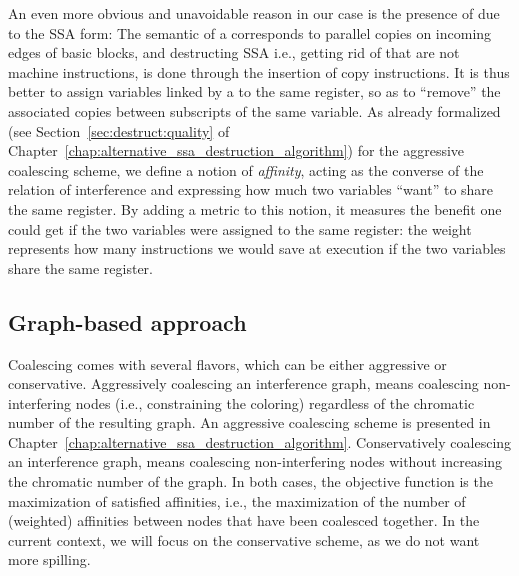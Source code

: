 {An even more obvious and unavoidable reason in our case is the presence of \phifuns due to the SSA form:
The semantic of a \phifun corresponds to parallel copies on incoming edges of basic blocks, and destructing SSA i.e., getting rid of \phifuns that are not machine instructions, is done through the insertion of copy instructions. 
It is thus better to assign variables linked by a \phifun to the same register, so as to ``remove'' the associated copies between subscripts of the same variable.
As already formalized (see Section~\ref{sec:destruct:quality} of Chapter~\ref{chap:alternative_ssa_destruction_algorithm}) for the aggressive coalescing scheme, we define a notion of \emph{affinity}, acting as the converse of the relation of interference and expressing how much two variables ``want'' to share the same register. 
By adding a metric to this notion, it measures the benefit one could get if the two variables were assigned to the same register: 
the weight represents how many instructions we would save at execution if the two variables share the same register. 


\subsection{Graph-based approach}
Coalescing comes with several flavors, which can be either aggressive or conservative.
Aggressively coalescing an interference graph, means coalescing non-interfering nodes (i.e., constraining the coloring) regardless of the chromatic number of the resulting graph.
An aggressive coalescing scheme is presented in Chapter~\ref{chap:alternative_ssa_destruction_algorithm}.
Conservatively coalescing an interference graph, means coalescing non-interfering nodes without increasing the chromatic number of the graph.
In both cases, the objective function is the maximization of satisfied affinities, i.e., the maximization of the number of (weighted) affinities between nodes that have been coalesced together.
In the current context, we will focus on the conservative scheme, as we do not want more spilling.

}
